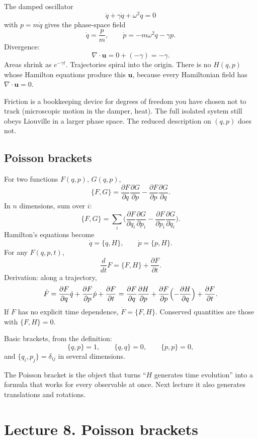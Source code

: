 \documentclass[11pt]{article}
\numberwithin{equation}{section}
\newcommand{\qdot}{\dot{q}}
\newcommand{\pdot}{\dot{p}}
\newcommand{\ddt}{\frac{d}{dt}}
\newcommand{\pd}[2]{\frac{\partial #1}{\partial #2}}
\newcommand{\vect}[1]{\mathbf{#1}}
\begin{document}
The damped oscillator
\[
\ddot q + \gamma\qdot + \omega^2 q = 0
\]
with $p=m\qdot$ gives the phase-space field
\[
\qdot = \frac{p}{m},\qquad
\pdot = -m\omega^2 q - \gamma p.
\]
Divergence:
\[
\nabla\cdot\vect{u} = 0 + (-\gamma) = -\gamma.
\]
Areas shrink as $e^{-\gamma t}$. Trajectories spiral into the origin. There is no $H(q,p)$ whose Hamilton equations produce this $\vect{u}$, because every Hamiltonian field has $\nabla\cdot\vect{u}=0$.

Friction is a bookkeeping device for degrees of freedom you have chosen not to track (microscopic motion in the damper, heat). The full isolated system still obeys Liouville in a larger phase space. The reduced description on $(q,p)$ does not.

\subsection{Poisson brackets}

For two functions $F(q,p)$, $G(q,p)$,
\begin{equation}
\label{eq:PB}
\{F,G\} = \pd{F}{q}\pd{G}{p} - \pd{F}{p}\pd{G}{q}.
\end{equation}
In $n$ dimensions, sum over $i$:
\[
\{F,G\} = \sum_i\Biggl(
\pd{F}{q_i}\pd{G}{p_i} - \pd{F}{p_i}\pd{G}{q_i}
\Biggr).
\]
Hamilton's equations become
\[
\qdot = \{q,H\},\qquad \pdot = \{p,H\}.
\]
For any $F(q,p,t)$,
\begin{equation}
\label{eq:Fdot}
\ddt F = \{F,H\} + \pd{F}{t}.
\end{equation}
Derivation: along a trajectory,
\[
\dot F = \pd{F}{q}\qdot + \pd{F}{p}\pdot + \pd{F}{t}
= \pd{F}{q}\pd{H}{p} + \pd{F}{p}\Bigl(-\pd{H}{q}\Bigr) + \pd{F}{t}.
\]
If $F$ has no explicit time dependence, $\dot F=\{F,H\}$. Conserved quantities are those with $\{F,H\}=0$.

Basic brackets, from the definition:
\[
\{q,p\}=1,\qquad \{q,q\}=0,\qquad \{p,p\}=0,
\]
and $\{q_i,p_j\}=\delta_{ij}$ in several dimensions.

The Poisson bracket is the object that turns ``$H$ generates time evolution'' into a formula that works for every observable at once. Next lecture it also generates translations and rotations.

\section{Lecture 8. Poisson brackets}
\end{document}
